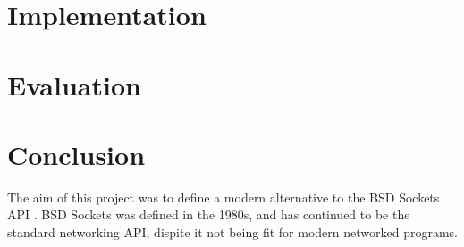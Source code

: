 \documentclass{l4proj}
\begin{document}
\chapter{Implementation}\label{ch:implementation}


\chapter{Evaluation}\label{ch:evaluation}


\chapter{Conclusion}\label{ch:conclusion}
The aim of this project was to define a modern alternative to the BSD Sockets API .
BSD Sockets was defined in the 1980s, and has continued to be the standard networking API, dispite it not being fit for
modern networked programs.

%
%
\end{document}
